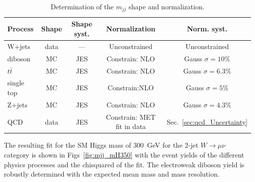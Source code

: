 \begin{table}[!ht]
  \begin{center}
 \caption{Determination of the $m_{jj}$ shape and normalization.}  
 \label{tab:mjj_shapes_and_normalization} 
 \begin{tabular} {l  c  c c c }
   \hline \hline
   Process                &    Shape                         &  Shape syst.           & Normalization   &  Norm. syst.\\  \hline
   W+jets                 &    data                      &  ---  & Unconstrained   &  Unconstrained \\
   diboson                &    MC                            &  JES                   & Constrain: NLO        &  Gauss $\sigma =10\%$ \\ 
   $t\bar{t}$ &    MC                            &  JES                   & Constrain: NLO        &  Gauss $\sigma =6.3\%$  \\ 
   single top & MC & JES & Constrain:NLO & Gauss $\sigma=5\%$ \\
   Z+jets                 &    MC                            &  JES                   & Constrain: NLO        &  Gauss $\sigma =4.3\%$  \\
   QCD                    &    data                          &  JES                   & Constrain: MET fit in data  &  Sec.~\ref{sec:qcd_Uncertainty}  \\\hline \hline
 \end{tabular}
\end{center}
\end{table}


The resulting fit for the SM Higgs mass of 300~GeV for the 2-jet
$W\to\mu\nu$ category is shown in Figs~\ref{fig:mjj_mH350} with the
event yields of the different physics processes and the chisquared of
the fit. 
The electroweak diboson yield is robustly determined with the expected mean mass and mass resolution. 

